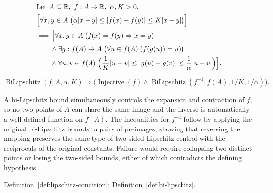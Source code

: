 \begin{remark*}
\[
\begin{aligned}
&\text{Let } A \subseteq \mathbb{R},\ f:A \to \mathbb{R},\ \alpha,K>0.\\
&\Bigl[\forall x,y \in A\;\bigl(\alpha |x-y| \le |f(x)-f(y)| \le K|x-y|\bigr)\Bigr]\\
&\Longrightarrow
\Bigl[\forall x,y \in A\;(f(x)=f(y) \Rightarrow x=y) \\
&\qquad\land \exists g:f(A)\to A\;\bigl(\forall u \in f(A)\;(f(g(u))=u)\bigr) \\
&\qquad\land \forall u,v \in f(A)\;\Bigl(\frac{1}{K}|u-v| \le |g(u)-g(v)| \le \frac{1}{\alpha}|u-v|\Bigr)\Bigr].
\end{aligned}
\]
\end{remark*}

\begin{remark*}
\[
\operatorname{BiLipschitz}(f,A,\alpha,K)
\Rightarrow
\bigl(\operatorname{Injective}(f) \land \operatorname{BiLipschitz}(f^{-1},f(A),1/K,1/\alpha)\bigr).
\]
\end{remark*}

\begin{remark*}[Interpretation]
A bi-Lipschitz bound simultaneously controls the expansion and contraction of $f$, so no two points of $A$ can share the same image and the inverse is automatically a well-defined function on $f(A)$. The inequalities for $f^{-1}$ follow by applying the original bi-Lipschitz bounds to pairs of preimages, showing that reversing the mapping preserves the same type of two-sided Lipschitz control with the reciprocals of the original constants. Failure would require collapsing two distinct points or losing the two-sided bounds, either of which contradicts the defining hypothesis.
\end{remark*}

\begin{dependencies}
\hyperref[def:lipschitz-condition]{Definition~\ref*{def:lipschitz-condition}}; \hyperref[def:bi-lipschitz]{Definition~\ref*{def:bi-lipschitz}}.
\end{dependencies}
